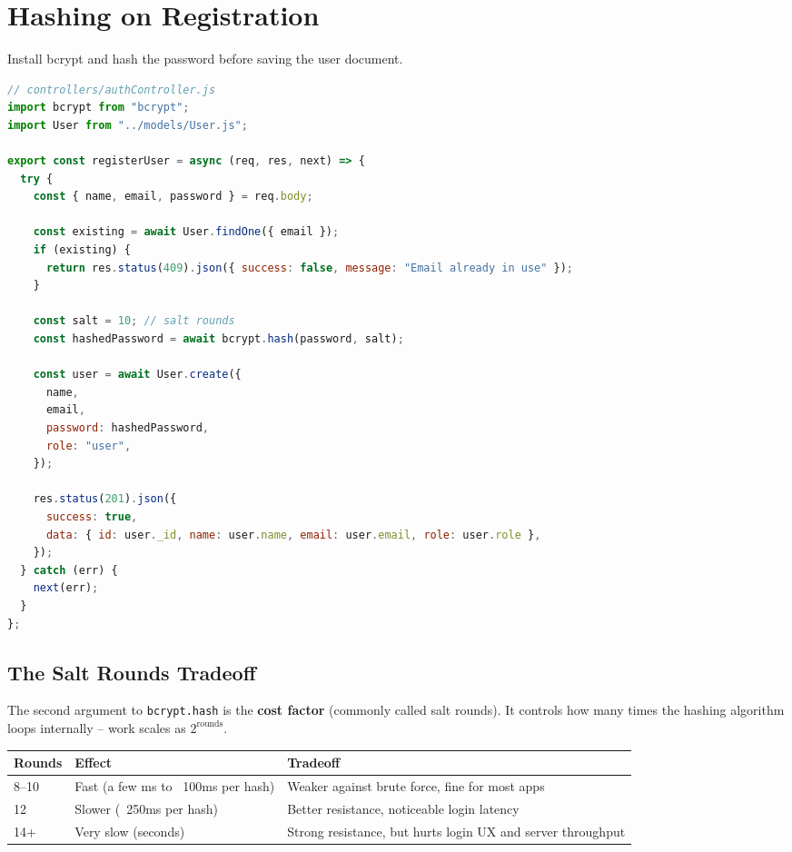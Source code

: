 \section{Hashing on Registration}

Install bcrypt and hash the password before saving the user document.

\begin{lstlisting}[language=JavaScript]
// controllers/authController.js
import bcrypt from "bcrypt";
import User from "../models/User.js";

export const registerUser = async (req, res, next) => {
  try {
    const { name, email, password } = req.body;

    const existing = await User.findOne({ email });
    if (existing) {
      return res.status(409).json({ success: false, message: "Email already in use" });
    }

    const salt = 10; // salt rounds
    const hashedPassword = await bcrypt.hash(password, salt);

    const user = await User.create({
      name,
      email,
      password: hashedPassword,
      role: "user",
    });

    res.status(201).json({
      success: true,
      data: { id: user._id, name: user.name, email: user.email, role: user.role },
    });
  } catch (err) {
    next(err);
  }
};
\end{lstlisting}

\subsection{The Salt Rounds Tradeoff}

The second argument to \texttt{bcrypt.hash} is the \textbf{cost factor}
(commonly called salt rounds). It controls how many times the hashing
algorithm loops internally -- work scales as $2^{\text{rounds}}$.

\begin{center}
\begin{tabularx}{\textwidth}{lXX}
\toprule
\textbf{Rounds} & \textbf{Effect} & \textbf{Tradeoff} \\
\midrule
8--10 & Fast (a few ms to ~100ms per hash) & Weaker against brute force, fine for most apps \\
12 & Slower (~250ms per hash) & Better resistance, noticeable login latency \\
14+ & Very slow (seconds) & Strong resistance, but hurts login UX and server throughput \\
\bottomrule
\end{tabularx}
\end{center}

